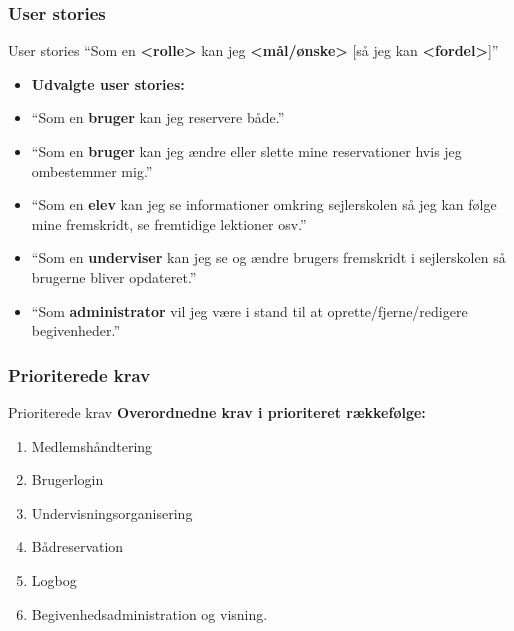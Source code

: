 \subsubsection{User stories}
\begin{frame}{User stories}
``Som en \textbf{<rolle>} kan jeg \textbf{<mål/ønske>} [så jeg kan \textbf{<fordel>}]'' \newline


\begin{itemize}
\item<2-7>[] \textbf{Udvalgte user stories:}
	\item<2-2,7> ``Som en \textbf{bruger} kan jeg reservere både.''
	\item<3-3,7> ``Som en \textbf{bruger} kan jeg ændre eller slette mine reservationer hvis jeg ombestemmer mig.''
	\item<4-4,7> ``Som en \textbf{elev} kan jeg se informationer omkring sejlerskolen så jeg kan følge mine fremskridt, se fremtidige lektioner osv.''
	\item<5-5,7> ``Som en \textbf{underviser} kan jeg se og ændre brugers fremskridt i sejlerskolen så brugerne bliver opdateret.''
	\item<6-6,7> ``Som \textbf{administrator} vil jeg være i stand til at oprette/fjerne/redigere begivenheder.''
\end{itemize}
\end{frame}


\subsubsection{Prioriterede krav}
\begin{frame}{Prioriterede krav}
\textbf{Overordnedne krav i prioriteret rækkefølge:}
\begin{enumerate}
  \item<+-> Medlemshåndtering
  \item<+-> Brugerlogin
  \item<+-> Undervisningsorganisering 
  \item<+-> Bådreservation
  \item<+-> Logbog
  \item<+-> Begivenhedsadministration og visning.
\end{enumerate}
\end{frame}

